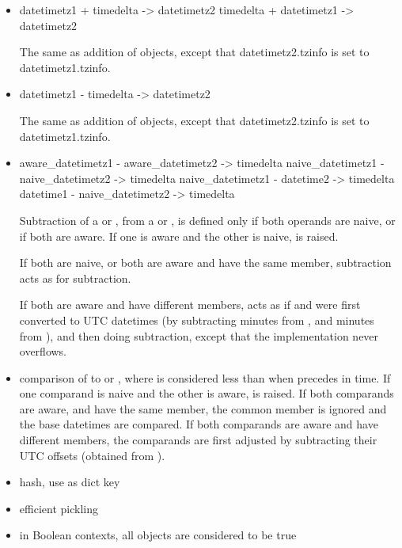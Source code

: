 \begin{itemize}
  \item
    datetimetz1 + timedelta -> datetimetz2
    timedelta + datetimetz1 -> datetimetz2

    The same as addition of  objects, except that
    datetimetz2.tzinfo is set to datetimetz1.tzinfo.

  \item
    datetimetz1 - timedelta -> datetimetz2

    The same as addition of  objects, except that
    datetimetz2.tzinfo is set to datetimetz1.tzinfo.

  \item
    aware_datetimetz1 - aware_datetimetz2 -> timedelta
    naive_datetimetz1 - naive_datetimetz2 -> timedelta
    naive_datetimetz1 - datetime2 -> timedelta
    datetime1 - naive_datetimetz2 -> timedelta

    Subtraction of a  or , from a
     or , is defined only if both
    operands are naive, or if both are aware.  If one is aware and the
    other is naive,  is raised.

    If both are naive, or both are aware and have the same 
    member, subtraction acts as for  subtraction.

    If both are aware and have different  members,
     acts as if  and  were first converted to UTC
    datetimes (by subtracting  minutes from ,
    and  minutes from ), and then doing
     subtraction, except that the implementation never
    overflows.

  \item
    comparison of  to  or
    , where  is considered less than 
    when  precedes  in time.  If one comparand is naive and
    the other is aware,  is raised.  If both
    comparands are aware, and have the same  member,
    the common  member is ignored and the base datetimes
    are compared.  If both comparands are aware and have different
     members, the comparands are first adjusted by
    subtracting their UTC offsets (obtained from ).

  \item
    hash, use as dict key

  \item
    efficient pickling

  \item
    in Boolean contexts, all  objects are considered to be
    true
\end{itemize}

